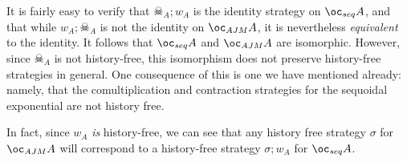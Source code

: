 \documentclass{article}
\newcommand{\ocajm}{\oc_{AJM}}
\newcommand{\ocseq}{\oc_{seq}}
\begin{document}
It is fairly easy to verify that $\skull_A;w_A$ is the identity strategy on $\ocseq A$, and that while $w_A;\skull_A$ is not the identity on $\ocajm A$, it is nevertheless \emph{equivalent} to the identity.  
It follows that $\ocseq A$ and $\ocajm A$ are isomorphic.  
However, since $\skull_A$ is not history-free, this isomorphism does not preserve history-free strategies in general.  
One consequence of this is one we have mentioned already: namely, that the comultiplication and contraction strategies for the sequoidal exponential are not history free.  

In fact, since $w_A$ \emph{is} history-free, we can see that any history free strategy $\sigma$ for $\ocajm A$ will correspond to a history-free strategy $\sigma;w_A$ for $\ocseq A$.



\end{document}
